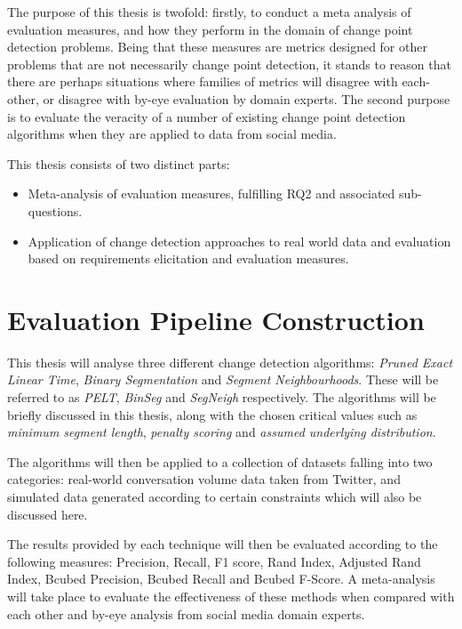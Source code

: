 \documentclass{uvamscse}	%
\begin{document}
The purpose of this thesis is twofold: firstly, to conduct a meta analysis of evaluation measures, and how they perform in the domain of change point detection problems. Being that these measures are metrics designed for other problems that are not necessarily change point detection, it stands to reason that there are perhaps situations where families of metrics will disagree with each-other, or disagree with by-eye evaluation by domain experts. The second purpose is to evaluate the veracity of a number of existing change point detection algorithms when they are applied to data from social media.

This thesis consists of two distinct parts:

\begin{itemize}
  \item Meta-analysis of evaluation measures, fulfilling RQ2 and associated sub-questions.
  \item Application of change detection approaches to real world data and evaluation based on requirements elicitation and evaluation measures.
\end{itemize}

\section{Evaluation Pipeline Construction}

This thesis will analyse three different change detection algorithms: \emph{Pruned Exact Linear Time}\cite{Killick2011a}, \emph{Binary Segmentation} \cite{Jackson2003} and \emph{Segment Neighbourhoods}\cite{Auger1989}. These will be referred to as \emph{PELT}, \emph{BinSeg} and \emph{SegNeigh} respectively. The algorithms will be briefly discussed in this thesis, along with the chosen critical values such as \emph{minimum segment length}, \emph{penalty scoring} and \emph{assumed underlying distribution}.

The algorithms will then be applied to a collection of datasets falling into two categories: real-world conversation volume data taken from Twitter, and simulated data generated according to certain constraints which will also be discussed here.

The results provided by each technique will then be evaluated according to the following measures: Precision, Recall, F1 score, Rand Index, Adjusted Rand Index, Bcubed Precision, Bcubed Recall and Bcubed F-Score. A meta-analysis will take place to evaluate the effectiveness of these methods when compared with each other and by-eye analysis from social media domain experts.
\end{document}
